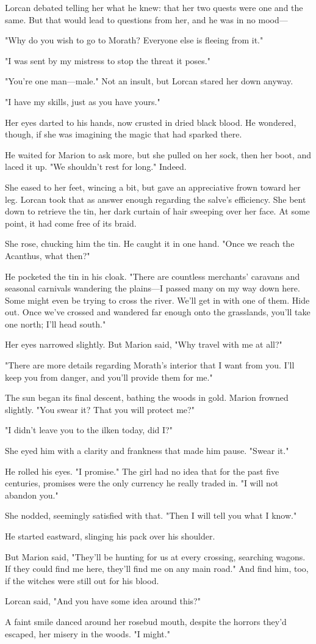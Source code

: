 Lorcan debated telling her what he knew: that her two quests were one and the same.
But that would lead to questions from her, and he was in no mood---

"Why do you wish to go to Morath?
Everyone else is fleeing from it."

"I was sent by my mistress to stop the threat it poses."

"You're one man---male."
Not an insult, but Lorcan stared her down anyway.

"I have my skills, just as you have yours."

Her eyes darted to his hands, now crusted in dried black blood.
He wondered, though, if she was imagining the magic that had sparked there.

He waited for Marion to ask more, but she pulled on her sock, then her boot, and laced it up.
"We shouldn't rest for long."
Indeed.

She eased to her feet, wincing a bit, but gave an appreciative frown toward her leg.
Lorcan took that as answer enough regarding the salve's efficiency.
She bent down to retrieve the tin, her dark curtain of hair sweeping over her face.
At some point, it had come free of its braid.

She rose, chucking him the tin.
He caught it in one hand.
"Once we reach the Acanthus, what then?"

He pocketed the tin in his cloak.
"There are countless merchants' caravans and seasonal carnivals wandering the plains---I passed many on my way down here.
Some might even be trying to cross the river.
We'll get in with one of them.
Hide out.
Once we've crossed and wandered far enough onto the grasslands, you'll take one north; I'll head south."

Her eyes narrowed slightly.
But Marion said, "Why travel with me at all?"

"There are more details regarding Morath's interior that I want from you.
I'll keep you from danger, and you'll provide them for me."

The sun began its final descent, bathing the woods in gold.
Marion frowned slightly.
"You swear it?
That you will protect me?"

"I didn't leave you to the ilken today, did I?"

She eyed him with a clarity and frankness that made him pause.
"Swear it."

He rolled his eyes.
"I promise."
The girl had no idea that for the past five centuries, promises were the only currency he really traded in.
"I will not abandon you."

She nodded, seemingly satisfied with that.
"Then I will tell you what I know."

He started eastward, slinging his pack over his shoulder.

But Marion said, "They'll be hunting for us at every crossing, searching wagons.
If they could find me here, they'll find me on any main road."
And find him, too, if the witches were still out for his blood.

Lorcan said, "And you have some idea around this?"

A faint smile danced around her rosebud mouth, despite the horrors they'd escaped, her misery in the woods.
"I might."
